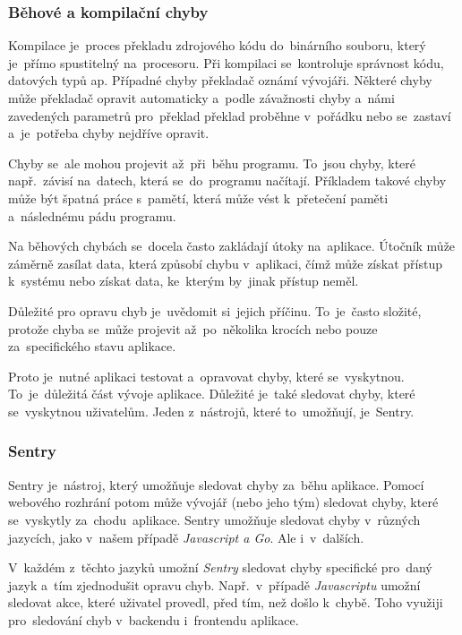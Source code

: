 \documentclass[14pt,a4paper]{article}
\begin{document}
            \subsubsection{Běhové a kompilační chyby}
            Kompilace je~proces překladu zdrojového kódu do~binárního souboru, který je~přímo spustitelný na~procesoru.
            Při kompilaci se~kontroluje správnost kódu, datových typů ap. Případné chyby překladač oznámí vývojáři.
            Některé chyby může překladač opravit automaticky a~podle závažnosti chyby a~námi zavedených parametrů pro~překlad
            překlad proběhne v~pořádku nebo se~zastaví a~je~potřeba chyby nejdříve opravit.

            Chyby se~ale mohou projevit až~při~běhu programu. To~jsou chyby, které např.~závisí na~datech, která se~do~programu načítají.
            Příkladem takové chyby může být špatná práce s~pamětí, která může vést k~přetečení paměti a~následnému pádu programu.

            Na běhových chybách se~docela často zakládají útoky na~aplikace. Útočník může záměrně zasílat data, která způsobí chybu v~aplikaci,
            čímž může získat přístup k~systému nebo získat data, ke~kterým by~jinak přístup neměl.

            Důležité pro opravu chyb je~uvědomit si~jejich příčinu. To~je~často složité, protože chyba se~může projevit až~po~několika krocích nebo pouze za~specifického stavu aplikace.

            Proto je~nutné aplikaci testovat a~opravovat chyby, které se~vyskytnou. To~je~důležitá část vývoje aplikace. Důležité je~také sledovat
            chyby, které se~vyskytnou uživatelům. Jeden z~nástrojů, které to~umožňují, je~Sentry.

            \subsubsection{Sentry}
            Sentry je~nástroj, který umožňuje sledovat chyby za~běhu aplikace.
            Pomocí webového rozhrání potom může vývojář (nebo jeho tým) sledovat chyby, které se~vyskytly za~chodu~aplikace.
            Sentry umožňuje sledovat chyby v~různých jazycích, jako v~našem případě \emph{Javascript a Go}. Ale i~v~dalších.


            V~každém z~těchto jazyků umožní \emph{Sentry} sledovat chyby specifické pro~daný jazyk a~tím zjednodušit opravu chyb.
            Např.~v~případě \emph{Javascriptu} umožní sledovat akce, které uživatel provedl, před tím, než došlo k~chybě. 
            Toho využiji pro~sledování chyb v~backendu i~frontendu aplikace.
\end{document}
